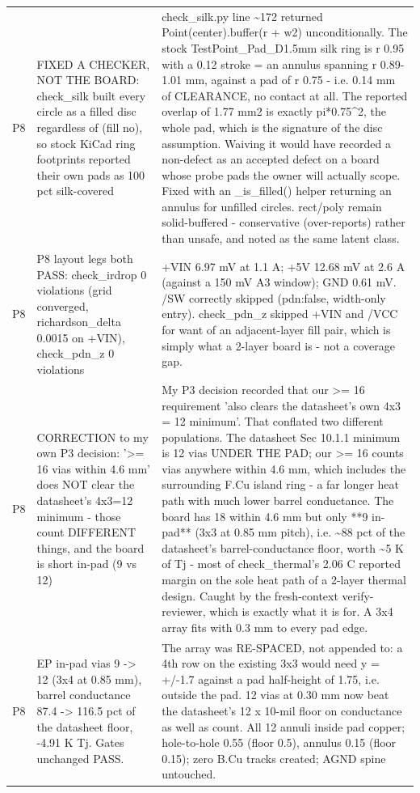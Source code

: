\documentclass[11pt,a4paper]{article}
\begin{document}
{\begin{longtable}{lp{5.2cm}p{7.2cm}}
P8 & FIXED A CHECKER, NOT THE BOARD: check\_silk built every circle as a filled disc regardless of (fill no), so stock KiCad ring footprints reported their own pads as 100 pct silk-covered & check\_silk.py line \textasciitilde{}172 returned Point(center).buffer(r + w2) unconditionally. The stock TestPoint\_Pad\_D1.5mm silk ring is r 0.95 with a 0.12 stroke = an annulus spanning r 0.89-1.01 mm, against a pad of r 0.75 - i.e. 0.14 mm of CLEARANCE, no contact at all. The reported overlap of 1.77 mm2 is exactly pi{*}0.75\textasciicircum{}2, the whole pad, which is the signature of the disc assumption. Waiving it would have recorded a non-defect as an accepted defect on a board whose probe pads the owner will actually scope. Fixed with an \_is\_filled() helper returning an annulus for unfilled circles. rect/poly remain solid-buffered - conservative (over-reports) rather than unsafe, and noted as the same latent class. \\
P8 & P8 layout legs both PASS: check\_irdrop 0 violations (grid converged, richardson\_delta 0.0015 on +VIN), check\_pdn\_z 0 violations & +VIN 6.97 mV at 1.1 A; +5V 12.68 mV at 2.6 A (against a 150 mV A3 window); GND 0.61 mV. /SW correctly skipped (pdn:false, width-only entry). check\_pdn\_z skipped +VIN and /VCC for want of an adjacent-layer fill pair, which is simply what a 2-layer board is - not a coverage gap. \\
P8 & CORRECTION to my own P3 decision: '\textgreater{}= 16 vias within 4.6 mm' does NOT clear the datasheet's 4x3=12 minimum - those count DIFFERENT things, and the board is short in-pad (9 vs 12) & My P3 decision recorded that our \textgreater{}= 16 requirement 'also clears the datasheet's own 4x3 = 12 minimum'. That conflated two different populations. The datasheet Sec 10.1.1 minimum is 12 vias UNDER THE PAD; our \textgreater{}= 16 counts vias anywhere within 4.6 mm, which includes the surrounding F.Cu island ring - a far longer heat path with much lower barrel conductance. The board has 18 within 4.6 mm but only {*}{*}9 in-pad{*}{*} (3x3 at 0.85 mm pitch), i.e. \textasciitilde{}88 pct of the datasheet's barrel-conductance floor, worth \textasciitilde{}5 K of Tj - most of check\_thermal's 2.06 C reported margin on the sole heat path of a 2-layer thermal design. Caught by the fresh-context verify-reviewer, which is exactly what it is for. A 3x4 array fits with 0.3 mm to every pad edge. \\
P8 & EP in-pad vias 9 -\textgreater{} 12 (3x4 at 0.85 mm), barrel conductance 87.4 -\textgreater{} 116.5 pct of the datasheet floor, -4.91 K Tj. Gates unchanged PASS. & The array was RE-SPACED, not appended to: a 4th row on the existing 3x3 would need y = +/-1.7 against a pad half-height of 1.75, i.e. outside the pad. 12 vias at 0.30 mm now beat the datasheet's 12 x 10-mil floor on conductance as well as count. All 12 annuli inside pad copper; hole-to-hole 0.55 (floor 0.5), annulus 0.15 (floor 0.15); zero B.Cu tracks created; AGND spine untouched. \\

\end{longtable}}
\end{document}
